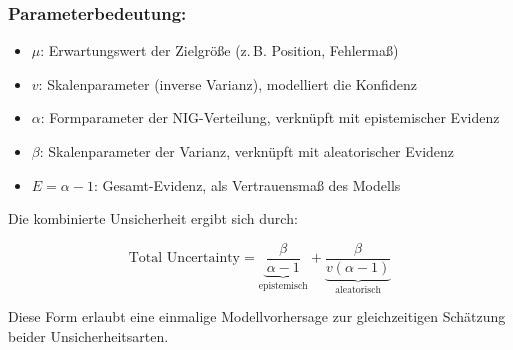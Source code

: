 \begin{otherlanguage}{ngerman}
\subsubsection*{Parameterbedeutung:}
\begin{itemize}
  \item $\mu$: Erwartungswert der Zielgröße (z.\,B. Position, Fehlermaß)
  \item $v$: Skalenparameter (inverse Varianz), modelliert die Konfidenz
  \item $\alpha$: Formparameter der NIG-Verteilung, verknüpft mit epistemischer Evidenz
  \item $\beta$: Skalenparameter der Varianz, verknüpft mit aleatorischer Evidenz
  \item $E = \alpha - 1$: Gesamt-Evidenz, als Vertrauensmaß des Modells
\end{itemize}

Die kombinierte Unsicherheit ergibt sich durch:

\begin{equation}
\text{Total Uncertainty} = \underbrace{\frac{\beta}{\alpha - 1}}_{\text{epistemisch}} + \underbrace{\frac{\beta}{v(\alpha - 1)}}_{\text{aleatorisch}}
\end{equation}

Diese Form erlaubt eine einmalige Modellvorhersage zur gleichzeitigen Schätzung beider Unsicherheitsarten.  
\end{otherlanguage}








